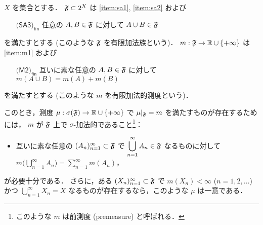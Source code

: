 \begin{theorem}\label{thm:Hopf_extension}
    \leavevmode\par
    $X$ を集合とする．
    $\mathfrak{F}\subset2^X$ は \ref{item:sa1}, \ref{item:sa2} および
    \begin{enumerate}[align=left]
        \item[$\textsf{(SA3)}_\textsf{fin}$] 任意の $A,B\in\mathfrak{F}$ に対して $A\cup B\in\mathfrak{F}$
    \end{enumerate}
    を満たすとする (このような $\mathfrak{F}$ を有限加法族という)．
    $m:\mathfrak{F}\to\mathbb{R}\cup\{+\infty\}$ は \ref{item:m1} および
    \begin{enumerate}[align=left]
        \item[$\textsf{(M2)}_\textsf{fin}$] 互いに素な任意の $A,B\in\mathfrak{F}$ に対して $m(A\cup B)=m(A)+m(B)$
    \end{enumerate}
    を満たすとする (このような $m$ を有限加法的測度という)．

    このとき，測度 $\mu:\sigma(\mathfrak{F})\to\mathbb{R}\cup\{+\infty\}$ で $\mu\vert_{\mathfrak{F}}=m$ を満たすものが存在するためには，
    $m$ が $\mathfrak{F}$ 上で $\sigma$-加法的であること\footnote{このような $m$ は前測度 (premeasure) と呼ばれる．}：
    \begin{itemize}
        \item 互いに素な任意の $(A_n)_{n=1}^\infty\subset\mathfrak{F}$ で
            $\displaystyle\bigcup_{n=1}^\infty A_n\in\mathfrak{F}$ なるものに対して
            $\displaystyle m\biggl(\bigcup_{n=1}^\infty A_n\biggr)=\sum_{n=1}^\infty m(A_n)$，
    \end{itemize}
    が必要十分である．
    さらに，ある $(X_n)_{n=1}^\infty\subset\mathfrak{F}$ で
    $m(X_n)<\infty$ ($n=1,2,\ldots$) かつ $\displaystyle\bigcup_{n=1}^\infty X_n=X$
    なるものが存在するなら，このような $\mu$ は一意である．
\end{theorem}

